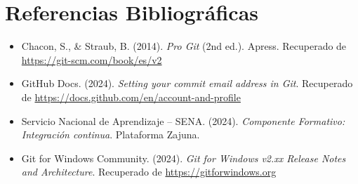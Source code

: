 \documentclass[11pt,a4paper]{article}
\begin{document}
\section{Referencias Bibliográficas}
\begin{itemize}[leftmargin=1.5cm]
    \item Chacon, S., \& Straub, B. (2014). \textit{Pro Git} (2nd ed.). Apress. Recuperado de \url{https://git-scm.com/book/es/v2}
    \item GitHub Docs. (2024). \textit{Setting your commit email address in Git}. Recuperado de \url{https://docs.github.com/en/account-and-profile}
    \item Servicio Nacional de Aprendizaje -- SENA. (2024). \textit{Componente Formativo: Integración continua}. Plataforma Zajuna.
    \item Git for Windows Community. (2024). \textit{Git for Windows v2.xx Release Notes and Architecture}. Recuperado de \url{https://gitforwindows.org}
\end{itemize}
\end{document}
